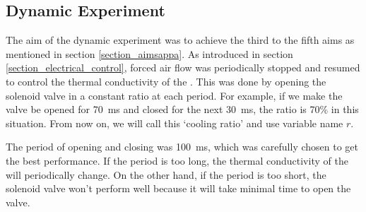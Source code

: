 \subsection{Dynamic Experiment}\label{section_dynamic} %
The aim of the dynamic experiment was to achieve the third to the fifth aims as mentioned in section \ref{section_aimsappa}.
As introduced in section \ref{section_electrical_control}, forced air flow was periodically stopped and resumed to control the thermal conductivity of the \scpnospace.
This was done by opening the solenoid valve in a constant ratio at each period. For example, if we make the valve be opened for \SI{70}{\milli\second} and closed for the next \SI{30}{\milli\second}, the ratio is 70\% in this situation. From now on, we will call this `cooling ratio' and use variable name $r$.
 
%

The period of opening and closing was \SI{100}{\milli\second}, which was carefully chosen to get the best performance. If the period is too long, the thermal conductivity of the \scps will periodically change. On the other hand, if the period is too short, the solenoid valve won't perform well because it will take minimal time to open the valve. 

